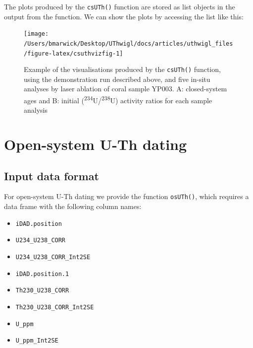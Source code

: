 \documentclass[]{elsarticle} %
\providecommand{\tightlist}{%
  \setlength{\itemsep}{0pt}\setlength{\parskip}{0pt}}
\newenvironment{Shaded}{\begin{snugshade}}{\end{snugshade}}
\newcommand{\NormalTok}[1]{#1}
\newcommand{\OperatorTok}[1]{\textcolor[rgb]{0.81,0.36,0.00}{\textbf{#1}}}
\begin{document}
The plots produced by the \texttt{csUTh()} function are stored as list objects in the output from the function. We can show the plots by accessing the list like this:



\begin{Shaded}
\end{Shaded}

\begin{figure}
\texttt{[image: /Users/bmarwick/Desktop/UThwigl/docs/articles/uthwigl\_files/figure-latex/csuthvizfig-1]} \caption{Example of the visualisations produced by the \texttt{csUTh()} function, using the demonstration run described above, and five in-situ analyses by laser ablation of coral sample YP003. A: closed-system ages and B: initial (\textsuperscript{234}U/\textsuperscript{238}U) activity ratios for each sample analysis}\label{fig:csuthvizfig}
\end{figure}

\FloatBarrier

\newpage

\hypertarget{open-system-u-th-dating}{%
\section{Open-system U-Th dating}\label{open-system-u-th-dating}}

\hypertarget{input-data-format-1}{%
\subsection{Input data format}\label{input-data-format-1}}

For open-system U-Th dating we provide the function \texttt{osUTh()}, which requires a data frame with the following column names:

\begin{itemize}
\tightlist
\item
  \texttt{iDAD.position}
\item
  \texttt{U234\_U238\_CORR}
\item
  \texttt{U234\_U238\_CORR\_Int2SE}
\item
  \texttt{iDAD.position.1}
\item
  \texttt{Th230\_U238\_CORR}
\item
  \texttt{Th230\_U238\_CORR\_Int2SE}
\item
  \texttt{U\_ppm}
\item
  \texttt{U\_ppm\_Int2SE}
\end{itemize}
\end{document}
